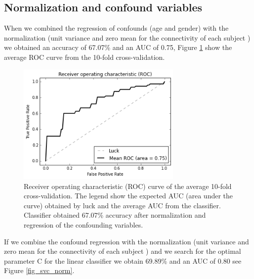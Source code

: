 \documentclass[12pt,journal,compsoc]{IEEEtran}
\begin{document}
\subsection{Normalization and confound variables}



When we combined the regression of confounds (age and gender) with the normalization (unit variance and zero mean for the connectivity of each subject ) we obtained an accuracy of 67.07\% and an AUC of 0.75, Figure \ref{fig_svc_norm_cnotopt} show the average ROC curve from the 10-fold cross-validation.


\begin{figure}[h]
\centering
\includegraphics[width=8cm]{svc_linear_cnotopt_normalized_scale64x64.png}
\caption{Receiver operating characteristic (ROC) curve of the average 10-fold cross-validation. The legend show the expected AUC (area under the curve) obtained by luck and the average AUC from the classifier. Classifier obtained 67.07\% accuracy after normalization and regression of the confounding variables.}
\label{fig_svc_norm_cnotopt}
\end{figure}


If we combine the confound regression with the normalization (unit variance and zero mean for the connectivity of each subject ) and we search for the optimal parameter C for the linear classifier we obtain 69.89\% and an AUC of 0.80 see Figure \ref{fig_svc_norm}.
\end{document}
